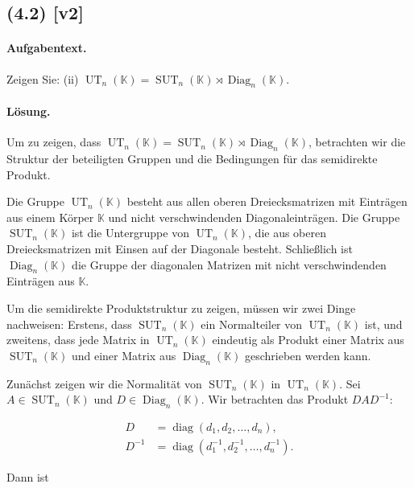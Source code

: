 \documentclass[11pt,a4paper]{article}
\begin{document}
\subsection*{(4.2) [v2]}
\paragraph{Aufgabentext.}
Zeigen Sie:
(ii) $\operatorname{UT}_n(\mathbb{K})=\operatorname{SUT}_n(\mathbb{K}) \rtimes \operatorname{Diag}_n(\mathbb{K})$.

\paragraph{Lösung.}
Um zu zeigen, dass $\operatorname{UT}_n(\mathbb{K}) = \operatorname{SUT}_n(\mathbb{K}) \rtimes \operatorname{Diag}_n(\mathbb{K})$, betrachten wir die Struktur der beteiligten Gruppen und die Bedingungen für das semidirekte Produkt.

Die Gruppe $\operatorname{UT}_n(\mathbb{K})$ besteht aus allen oberen Dreiecksmatrizen mit Einträgen aus einem Körper $\mathbb{K}$ und nicht verschwindenden Diagonaleinträgen. Die Gruppe $\operatorname{SUT}_n(\mathbb{K})$ ist die Untergruppe von $\operatorname{UT}_n(\mathbb{K})$, die aus oberen Dreiecksmatrizen mit Einsen auf der Diagonale besteht. Schließlich ist $\operatorname{Diag}_n(\mathbb{K})$ die Gruppe der diagonalen Matrizen mit nicht verschwindenden Einträgen aus $\mathbb{K}$.

Um die semidirekte Produktstruktur zu zeigen, müssen wir zwei Dinge nachweisen: Erstens, dass $\operatorname{SUT}_n(\mathbb{K})$ ein Normalteiler von $\operatorname{UT}_n(\mathbb{K})$ ist, und zweitens, dass jede Matrix in $\operatorname{UT}_n(\mathbb{K})$ eindeutig als Produkt einer Matrix aus $\operatorname{SUT}_n(\mathbb{K})$ und einer Matrix aus $\operatorname{Diag}_n(\mathbb{K})$ geschrieben werden kann.

Zunächst zeigen wir die Normalität von $\operatorname{SUT}_n(\mathbb{K})$ in $\operatorname{UT}_n(\mathbb{K})$. Sei $A \in \operatorname{SUT}_n(\mathbb{K})$ und $D \in \operatorname{Diag}_n(\mathbb{K})$. Wir betrachten das Produkt $DAD^{-1}$:

\begin{align*}
D &= \operatorname{diag}(d_1, d_2, \ldots, d_n), \\
D^{-1} &= \operatorname{diag}(d_1^{-1}, d_2^{-1}, \ldots, d_n^{-1}).
\end{align*}

Dann ist
\end{document}

